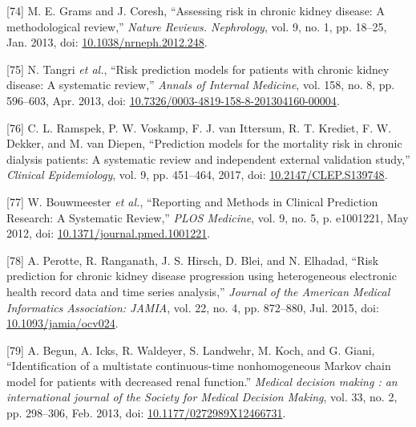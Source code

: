 \documentclass[12pt,PhD,twoside,openright]{muthesis}
\newenvironment{cslreferences}%
  {}%
  {\par}
\begin{document}
\begin{cslreferences}
\leavevmode\hypertarget{ref-grams_assessing_2013}{}%
{[}74{]} M. E. Grams and J. Coresh, ``Assessing risk in chronic kidney disease: A methodological review,'' \emph{Nature Reviews. Nephrology}, vol. 9, no. 1, pp. 18--25, Jan. 2013, doi: \href{https://doi.org/10.1038/nrneph.2012.248}{10.1038/nrneph.2012.248}.

\leavevmode\hypertarget{ref-tangri_risk_2013}{}%
{[}75{]} N. Tangri \emph{et al.}, ``Risk prediction models for patients with chronic kidney disease: A systematic review,'' \emph{Annals of Internal Medicine}, vol. 158, no. 8, pp. 596--603, Apr. 2013, doi: \href{https://doi.org/10.7326/0003-4819-158-8-201304160-00004}{10.7326/0003-4819-158-8-201304160-00004}.

\leavevmode\hypertarget{ref-ramspek_prediction_2017}{}%
{[}76{]} C. L. Ramspek, P. W. Voskamp, F. J. van Ittersum, R. T. Krediet, F. W. Dekker, and M. van Diepen, ``Prediction models for the mortality risk in chronic dialysis patients: A systematic review and independent external validation study,'' \emph{Clinical Epidemiology}, vol. 9, pp. 451--464, 2017, doi: \href{https://doi.org/10.2147/CLEP.S139748}{10.2147/CLEP.S139748}.

\leavevmode\hypertarget{ref-bouwmeester_reporting_2012-1}{}%
{[}77{]} W. Bouwmeester \emph{et al.}, ``Reporting and Methods in Clinical Prediction Research: A Systematic Review,'' \emph{PLOS Medicine}, vol. 9, no. 5, p. e1001221, May 2012, doi: \href{https://doi.org/10.1371/journal.pmed.1001221}{10.1371/journal.pmed.1001221}.

\leavevmode\hypertarget{ref-perotte_risk_2015}{}%
{[}78{]} A. Perotte, R. Ranganath, J. S. Hirsch, D. Blei, and N. Elhadad, ``Risk prediction for chronic kidney disease progression using heterogeneous electronic health record data and time series analysis,'' \emph{Journal of the American Medical Informatics Association: JAMIA}, vol. 22, no. 4, pp. 872--880, Jul. 2015, doi: \href{https://doi.org/10.1093/jamia/ocv024}{10.1093/jamia/ocv024}.

\leavevmode\hypertarget{ref-begun_identification_2013}{}%
{[}79{]} A. Begun, A. Icks, R. Waldeyer, S. Landwehr, M. Koch, and G. Giani, ``Identification of a multistate continuous-time nonhomogeneous Markov chain model for patients with decreased renal function.'' \emph{Medical decision making : an international journal of the Society for Medical Decision Making}, vol. 33, no. 2, pp. 298--306, Feb. 2013, doi: \href{https://doi.org/10.1177/0272989X12466731}{10.1177/0272989X12466731}.


\end{cslreferences}
\end{document}
